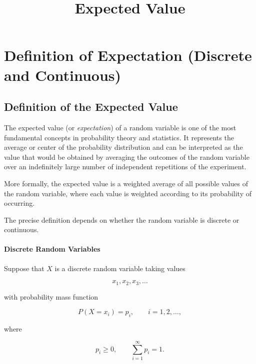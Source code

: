 \documentclass[11pt]{article}
\title{Expected Value}
\author{}
\date{}
\begin{document}
	
	\maketitle
	\tableofcontents
	
	
	\section{Definition of Expectation (Discrete and Continuous)}
	\begin{mdframed}[
		linewidth=0.8pt,
		roundcorner=6pt,
		backgroundcolor=gray!5,
		linecolor=gray!60,
		innertopmargin=10pt,
		innerbottommargin=10pt,
		innerleftmargin=10pt,
		innerrightmargin=10pt
		]
		
		\subsection*{Definition of the Expected Value}
		
		The expected value (or \emph{expectation}) of a random variable is one of the
		most fundamental concepts in probability theory and statistics. It
		represents the average or center of the probability distribution and can be
		interpreted as the value that would be obtained by averaging the outcomes of
		the random variable over an indefinitely large number of independent
		repetitions of the experiment.
		
		More formally, the expected value is a weighted average of all possible
		values of the random variable, where each value is weighted according to its
		probability of occurring.
		
		The precise definition depends on whether the random variable is discrete or
		continuous.
		
		\bigskip
		
		\paragraph{Discrete Random Variables}
		
		Suppose that $X$ is a discrete random variable taking values
		
		\[
		x_1,x_2,x_3,\ldots
		\]
		
		with probability mass function
		
		\[
		P(X=x_i)=p_i,
		\qquad
		i=1,2,\ldots,
		\]
		
		where
		
		\[
		p_i\ge0,
		\qquad
		\sum_{i=1}^{\infty}p_i=1.
		\]
		

\end{mdframed}
\end{document}
